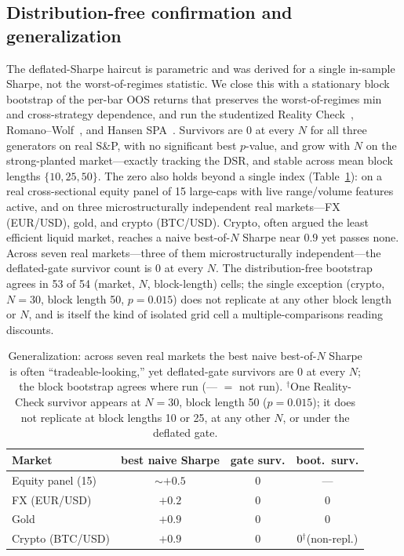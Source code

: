 \documentclass[sigconf,review,anonymous]{acmart}
\begin{document}
\subsection{Distribution-free confirmation and generalization}
The deflated-Sharpe haircut is parametric and was derived for a single in-sample Sharpe, not the worst-of-regimes statistic. We close this with a stationary block bootstrap of the per-bar OOS returns that preserves the worst-of-regimes min and cross-strategy dependence, and run the studentized Reality Check~\cite{white2000}, Romano--Wolf~\cite{romanowolf2005}, and Hansen SPA~\cite{hansen2005}. Survivors are $0$ at every $N$ for all three generators on real S\&P, with no significant best $p$-value, and grow with $N$ on the strong-planted market---exactly tracking the DSR, and stable across mean block lengths $\{10,25,50\}$. The zero also holds beyond a single index (Table~\ref{tab:markets}): on a real cross-sectional equity panel of 15 large-caps with live range/volume features active, and on three microstructurally independent real markets---FX (EUR/USD), gold, and crypto (BTC/USD). Crypto, often argued the least efficient liquid market, reaches a naive best-of-$N$ Sharpe near $0.9$ yet passes none. Across seven real markets---three of them microstructurally independent---the deflated-gate survivor count is $0$ at every $N$. The distribution-free bootstrap agrees in 53 of 54 (market, $N$, block-length) cells; the single exception (crypto, $N{=}30$, block length 50, $p{=}0.015$) does not replicate at any other block length or $N$, and is itself the kind of isolated grid cell a multiple-comparisons reading discounts.

\begin{table}[t]
\caption{Generalization: across seven real markets the best naive best-of-$N$ Sharpe is often ``tradeable-looking,'' yet deflated-gate survivors are 0 at every $N$; the block bootstrap agrees where run (--- $=$ not run). $^{\dagger}$One Reality-Check survivor appears at $N{=}30$, block length 50 ($p{=}0.015$); it does not replicate at block lengths 10 or 25, at any other $N$, or under the deflated gate.}
\label{tab:markets}
\small
\begin{tabular}{@{}lccc@{}}
\toprule
Market & best naive Sharpe & gate surv. & boot.\ surv. \\
\midrule
Equity panel (15) & ${\sim}+0.5$ & 0 & --- \\
FX (EUR/USD) & $+0.2$ & 0 & 0 \\
Gold & $+0.9$ & 0 & 0 \\
Crypto (BTC/USD) & $+0.9$ & 0 & 0$^{\dagger}$(non-repl.) \\
\bottomrule
\end{tabular}
\end{table}
\end{document}
